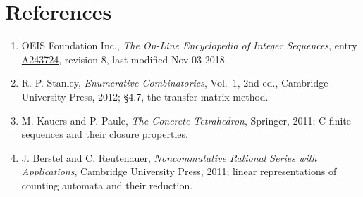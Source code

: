 \documentclass[11pt]{article}
\theoremstyle{definition}
\begin{document}
\section{References}

\begin{enumerate}

\item OEIS Foundation Inc., \emph{The On-Line Encyclopedia of Integer Sequences}, entry \href{https://oeis.org/A243724}{A243724}, revision 8, last modified Nov 03 2018.

\item R. P. Stanley, \emph{Enumerative Combinatorics}, Vol.~1, 2nd ed., Cambridge University Press, 2012; \S4.7, the transfer-matrix method.

\item M. Kauers and P. Paule, \emph{The Concrete Tetrahedron}, Springer, 2011; C-finite sequences and their closure properties.

\item J. Berstel and C. Reutenauer, \emph{Noncommutative Rational Series with Applications}, Cambridge University Press, 2011; linear representations of counting automata and their reduction.

\end{enumerate}
\end{document}
